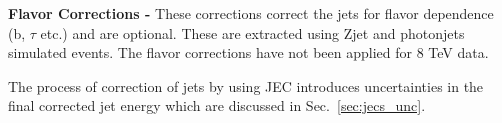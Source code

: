 {\bf Flavor Corrections -} These corrections correct the jets for flavor dependence (b, $\tau$ etc.) and are optional. These are extracted using Z\plusn jet and photon\plusn jets simulated events. The flavor corrections have not been applied for 8 TeV data.

The process of correction of jets by using JEC introduces uncertainties in the final corrected jet energy which are discussed in Sec.~\ref{sec:jecs_unc}.
